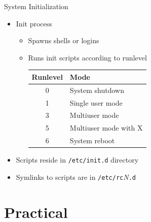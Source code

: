 \documentclass{workshop}
\begin{document}
\begin{frame}{System Initialization}
\begin{itemize}
	\item Init process
		\begin{itemize}
			\item Spawns shells or logins
			\item Runs init scripts according to runlevel\\
				\vskip5pt
				\begin{tabular}{cl}
					\hline
					\textbf{Runlevel} & \textbf{Mode} \\
					\hline
					0 & System shutdown \\
					1 & Single user mode \\
					3 & Multiuser mode \\
					5 & Multiuser mode with X\\
					6 & System reboot \\
					\hline
				\end{tabular}
				\vskip5pt
		\end{itemize}
	\item Scripts reside in \texttt{/etc/init.d} directory
	\item Symlinks to scripts are in \texttt{/etc/rc}\textit{N}\texttt{.d}
\end{itemize}
\end{frame}

\section{Practical}
\end{document}
